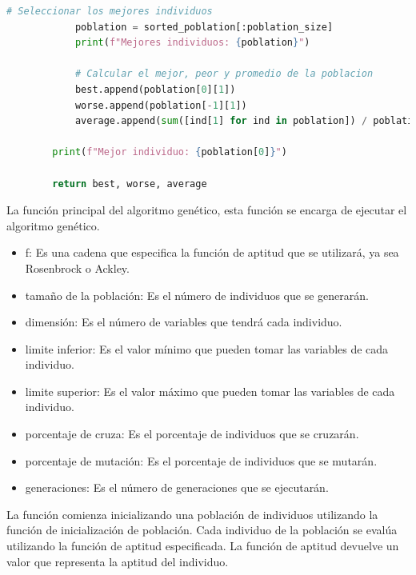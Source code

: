 \documentclass{report}
\begin{document}
\begin{lstlisting}[language=Python, style=mystyle, caption={Funcion genetico}]
            # Seleccionar los mejores individuos
            poblation = sorted_poblation[:poblation_size]
            print(f"Mejores individuos: {poblation}")
    
            # Calcular el mejor, peor y promedio de la poblacion
            best.append(poblation[0][1])
            worse.append(poblation[-1][1])
            average.append(sum([ind[1] for ind in poblation]) / poblation_size)
    
        print(f"Mejor individuo: {poblation[0]}")
        
        return best, worse, average
    \end{lstlisting}

    La función principal del algoritmo genético, esta función se encarga de ejecutar el algoritmo genético.

    \begin{itemize}
        \item f: Es una cadena que especifica la función de aptitud que se utilizará, ya sea Rosenbrock o Ackley.
        \item tamaño de la población: Es el número de individuos que se generarán.
        \item dimensión: Es el número de variables que tendrá cada individuo.
        \item limite inferior: Es el valor mínimo que pueden tomar las variables de cada individuo.
        \item limite superior: Es el valor máximo que pueden tomar las variables de cada individuo.
        \item porcentaje de cruza: Es el porcentaje de individuos que se cruzarán.
        \item porcentaje de mutación: Es el porcentaje de individuos que se mutarán.
        \item generaciones: Es el número de generaciones que se ejecutarán.
    \end{itemize}

    La función comienza inicializando una población de individuos utilizando la función de inicialización de población. Cada individuo de la
    población se evalúa utilizando la función de aptitud especificada. La función de aptitud devuelve un valor que representa la aptitud del individuo.
\end{document}
